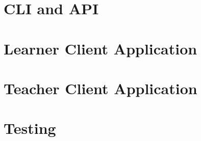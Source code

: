 \section{CLI and API}

\section{Learner Client Application}

\section{Teacher Client Application}

\section{Testing}